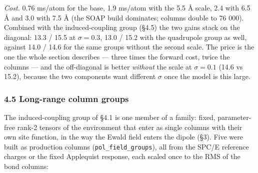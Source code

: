 \documentclass[
  10pt,
]{article}
\begin{document}
\emph{Cost.} 0.76 ms/atom for the base, 1.9 ms/atom with the 5.5 \AA{} scale, 2.4 with 6.5 \AA{} and
3.0 with 7.5 \AA{} (the SOAP build dominates; columns double to 76 000). Combined with the
induced-coupling group (§4.5) the two gains stack on the diagonal: 13.3 / 15.5 at \(\sigma=0.3\),
13.0 / 15.2 with the quadrupole group as well, against 14.0 / 14.6 for the same groups without the
second scale. The price is the one the whole section describes --- three times the forward cost,
twice the columns --- and the off-diagonal is better \emph{without} the scale at \(\sigma=0.1\)
(14.6 vs 15.2), because the two components want different \(\sigma\) once the model is this large.

\subsubsection{4.5 Long-range column groups}\label{long-range-column-groups}

The induced-coupling group of §4.1 is one member of a family: fixed, parameter-free rank-2 tensors
of the environment that enter as single columns with their own site function, in the way the Ewald
field enters the dipole (§3). Five were built as production columns (\texttt{pol\_field\_groups}),
all from the SPC/E reference charges or the fixed Applequist response, each scaled once to the RMS
of the bond columns:
\end{document}

